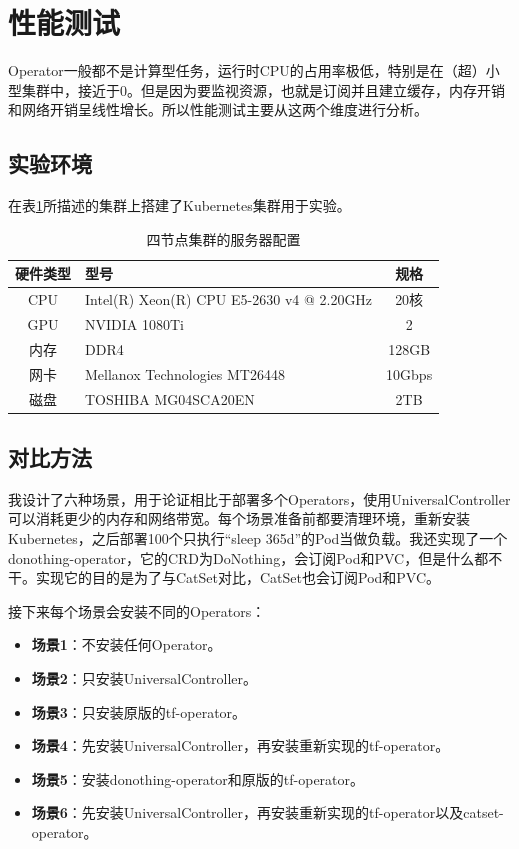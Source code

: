 \documentclass[macfonts,master]{njuthesis}
\begin{document}
\section{性能测试}

Operator一般都不是计算型任务，运行时CPU的占用率极低，特别是在（超）小型集群中，接近于0。但是因为要监视资源，也就是订阅并且建立缓存，内存开销和网络开销呈线性增长。所以性能测试主要从这两个维度进行分析。

\subsection{实验环境}

在表\ref{table:test-env}所描述的集群上搭建了Kubernetes集群用于实验。
\begin{table}
  \centering
  \begin{tabular}{cp{60mm}c}
    \toprule
    \textbf{硬件类型} & \textbf{型号} & \textbf{规格} \\
    \midrule
    CPU  & Intel(R) Xeon(R) CPU E5-2630 v4 @ 2.20GHz  & 20核\\
    GPU  & NVIDIA 1080Ti   &  2 \\
    内存     & DDR4 & 128GB \\
    网卡    & Mellanox Technologies MT26448   & 10Gbps \\
    磁盘 & TOSHIBA MG04SCA20EN & 2TB \\
    \bottomrule
  \end{tabular}
  \caption{四节点集群的服务器配置}\label{table:test-env}
\end{table}

\subsection{对比方法}

我设计了六种场景，用于论证相比于部署多个Operators，使用UniversalController可以消耗更少的内存和网络带宽。每个场景准备前都要清理环境，重新安装Kubernetes，之后部署100个只执行“sleep 365d”的Pod当做负载。我还实现了一个donothing-operator，它的CRD为DoNothing，会订阅Pod和PVC，但是什么都不干。实现它的目的是为了与CatSet对比，CatSet也会订阅Pod和PVC。

接下来每个场景会安装不同的Operators：
\begin{itemize}
	\item \textbf{场景1}：不安装任何Operator。
	\item \textbf{场景2}：只安装UniversalController。
	\item \textbf{场景3}：只安装原版的tf-operator。
	\item \textbf{场景4}：先安装UniversalController，再安装重新实现的tf-operator。
	\item \textbf{场景5}：安装donothing-operator和原版的tf-operator。
	\item \textbf{场景6}：先安装UniversalController，再安装重新实现的tf-operator以及catset-operator。
\end{itemize}
\end{document}
